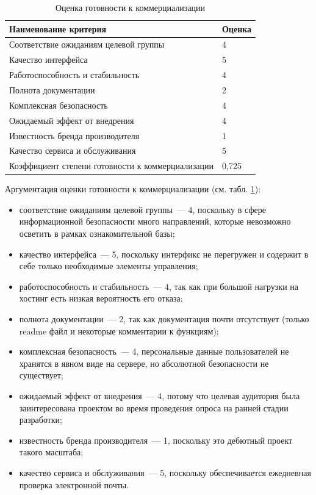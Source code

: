 \begin{table}[htb]
	\caption{Оценка готовности к коммерциализации}
	\centering
	
	\emergencystretch=10pt
	\begin{tabular}{@{}ll@{}}
		\toprule
		\textbf{Наименование критерия}                       & \textbf{Оценка} \\ \midrule
		Соответствие ожиданиям целевой группы           & 4              \\
		Качество интерфейса                            & 5              \\
		Работоспособность и стабильность               & 4              \\
		Полнота документации                           & 2              \\
		Комплексная безопасность                       & 4              \\
		Ожидаемый эффект от внедрения                  & 4              \\
		Известность бренда производителя               & 1              \\
		Качество сервиса и обслуживания                & 5              \\ \midrule
		Коэффициент степени готовности к коммерциализации & 0,725        \\ \bottomrule
	\end{tabular}
	\label{tab:prepare_mark}
\end{table}

Аргументация оценки готовности к коммерциализации (см. табл. \ref{tab:prepare_mark}):
\begin{itemize}
	\item соответствие ожиданиям целевой группы~--– 4, поскольку в сфере информационной безопасности много направлений, которые невозможно осветить в рамках ознакомительной базы;
	\item качество интерфейса~--– 5, поскольку интерфикс не перегружен и содержит в себе только необходимые элементы управления;
	\item работоспособность и стабильность~--– 4, так как при большой нагрузки на хостинг есть низкая вероятность его отказа;
	\item полнота документации~--– 2, так как документация почти отсутствует (только readme файл и некоторые комментарии к функциям);
	\item комплексная безопасность~--– 4, персональные данные пользователей не хранятся в явном виде на сервере, но абсолютной безопасности не существует; 
	\item ожидаемый эффект от внедрения~--– 4, потому что целевая аудитория была заинтересована проектом во время проведения опроса на ранней стадии разработки;  
	\item известность бренда производителя~--- 1, поскольку это дебютный проект такого масштаба;
	\item качество сервиса и обслуживания~--- 5, поскольку обеспечивается ежедневная проверка электронной почты.
\end{itemize}

